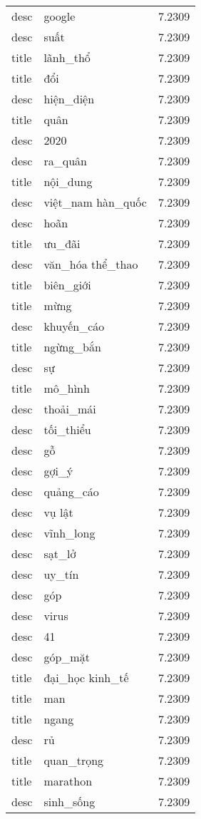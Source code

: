 \documentclass{article}
\begin{document}
\begin{tabular}{lll}
desc & google & 7.2309\\
desc & suất & 7.2309\\
title & lãnh\_thổ & 7.2309\\
title & đổi & 7.2309\\
desc & hiện\_diện & 7.2309\\
title & quân & 7.2309\\
desc & 2020 & 7.2309\\
desc & ra\_quân & 7.2309\\
title & nội\_dung & 7.2309\\
desc & việt\_nam hàn\_quốc & 7.2309\\
desc & hoãn & 7.2309\\
title & ưu\_đãi & 7.2309\\
desc & văn\_hóa thể\_thao & 7.2309\\
title & biên\_giới & 7.2309\\
title & mừng & 7.2309\\
desc & khuyến\_cáo & 7.2309\\
title & ngừng\_bắn & 7.2309\\
desc & sự & 7.2309\\
title & mô\_hình & 7.2309\\
desc & thoải\_mái & 7.2309\\
desc & tối\_thiểu & 7.2309\\
desc & gỗ & 7.2309\\
desc & gợi\_ý & 7.2309\\
desc & quảng\_cáo & 7.2309\\
desc & vụ lật & 7.2309\\
desc & vĩnh\_long & 7.2309\\
desc & sạt\_lở & 7.2309\\
desc & uy\_tín & 7.2309\\
desc & góp & 7.2309\\
desc & virus & 7.2309\\
desc & 41 & 7.2309\\
desc & góp\_mặt & 7.2309\\
title & đại\_học kinh\_tế & 7.2309\\
title & man & 7.2309\\
title & ngang & 7.2309\\
desc & rủ & 7.2309\\
title & quan\_trọng & 7.2309\\
title & marathon & 7.2309\\
desc & sinh\_sống & 7.2309\\

\end{tabular}
\end{document}
